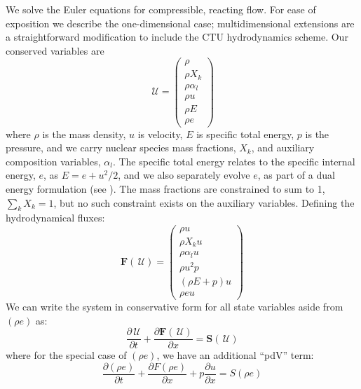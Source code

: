 \documentclass[times,modern]{aastex63}
\newcommand{\ddx}[1]{{\frac{{\partial#1}}{\partial x}}}
\newcommand{\ddt}[1]{{\frac{{\partial#1}}{\partial t}}}
\newcommand{\Uc}{{\,\bm{\mathcal{U}}}}
\newcommand{\Fb}{\mathbf{F}}
\newcommand{\Sc}{\mathbf{S}}
\begin{document}
We solve the Euler equations for compressible, reacting flow.  For ease
of exposition we describe the one-dimensional case;
multidimensional extensions are a straightforward modification to
include the CTU hydrodynamics scheme.  Our conserved variables are
\begin{equation}
  \Uc = \left ( \begin{array}{c}
           \rho \\
           \rho X_k \\
           \rho \alpha_l \\
           \rho u \\
           \rho E \\
           \rho e \end{array}\right )
\end{equation}
where $\rho$ is the mass density, $u$ is velocity, $E$ is specific
total energy, $p$ is the pressure, and we carry nuclear species mass
fractions, $X_k$, and auxiliary composition variables, $\alpha_l$.  The specific total
energy relates to the specific internal energy, $e$, as $E = e + u^2/2$,
and we also separately evolve $e$, as part of a dual
energy formulation (see \citealt{bryan:1995,wdmergerI}).
 The mass fractions are constrained to sum to 1, $\sum_k X_k = 1$, but
 no such constraint exists on the auxiliary variables. 
Defining the hydrodynamical fluxes:
\begin{equation}
  \Fb(\Uc) = \left ( \begin{array}{c}
         \rho u \\
         \rho X_k u \\
         \rho \alpha_l u \\
         \rho u^2 p \\
         (\rho E + p) u \\
         \rho e u \end{array}\right )
\end{equation}
We can write the system in conservative form for all state variables aside from $(\rho e)$ as:
\begin{equation}
  \ddt{\Uc} + \ddx{\Fb(\Uc)} = \Sc(\Uc)
\end{equation}
where for the special case of $(\rho e)$, we have an additional ``pdV'' term:
\begin{equation}
\ddt{(\rho e)} + \ddx{F(\rho e)} + p \ddx{u} = S(\rho e)
\end{equation}
\end{document}
